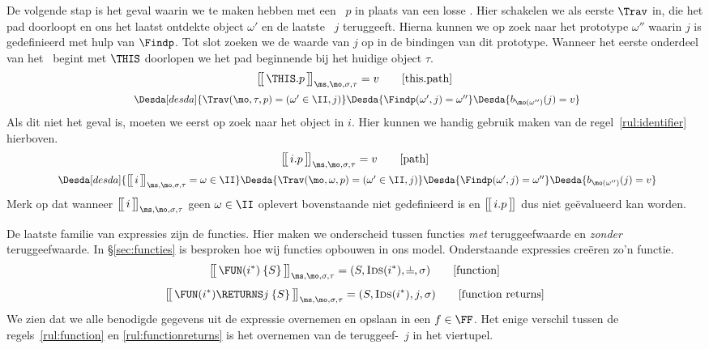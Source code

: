 De volgende stap is het geval waarin we te maken hebben met een \Path\ $p$ in plaats van een losse \Id. Hier schakelen we als eerste $\Trav$ in, die het pad doorloopt en ons het laatst ontdekte object $\omega'$ en de laatste \Id\ $j$ teruggeeft. Hierna kunnen we op zoek naar het prototype $\omega''$ waarin $j$ is gedefinieerd met hulp van $\Findp$. Tot slot zoeken we de waarde van $j$ op in de bindingen van dit prototype. Wanneer het eerste onderdeel van het \Path\ begint met $\THIS$ doorlopen we het pad beginnende bij het huidige object $\tau$.
%
\begin{gather*}
  \Express{\THIS.p}{\ms,\mo,\sigma,\tau} = v
  \tag*{[this.path]} \\
  \Desdas{
    \Desda[desda]{\Trav(\mo, \tau, p) = (\omega' \in \II, j)}
    \Desda{\Findp(\omega',j) = \omega''}
    \Desda{b_{\mo(\omega'')}(j) = v}
  }
\end{gather*}
%
Als dit niet het geval is, moeten we eerst op zoek naar het object in $i$. Hier kunnen we handig gebruik maken van de regel~\ref{rul:identifier} hierboven.
%
\begin{gather*}
  \Express{i.p}{\ms,\mo,\sigma,\tau} = v
  \tag*{[path]} \\
  \Desdas{
    \Desda[desda]{\Express{i}{\ms,\mo,\sigma,\tau} = \omega \in \II}
    \Desda{\Trav(\mo, \omega, p) = (\omega' \in \II, j)}
    \Desda{\Findp(\omega',j) = \omega''}
    \Desda{b_{\mo(\omega'')}(j) = v}
  }
\end{gather*}
%
Merk op dat wanneer $\Express{i}{\ms,\mo,\sigma,\tau}$ geen $\omega \in \II$ oplevert bovenstaande niet gedefinieerd is en $\big[\!\big[\,i.p\,\big]\!\big]^\text{}_{}$ dus niet geëvalueerd kan worden.

De laatste familie van expressies zijn de functies. Hier maken we onderscheid tussen functies \emph{met} teruggeefwaarde en \emph{zonder} teruggeefwaarde. In §\ref{sec:functies} is besproken hoe wij functies opbouwen in ons model. Onderstaande expressies creëren zo'n functie.
%
\begin{equation}
  \Express{\FUN (i^*) \: \{S\}}{\ms,\mo,\sigma,\tau} = (S, \textsc{Ids}(i^*), \nil, \sigma)
  \tag*{[function]}\label{rul:function}
\end{equation}
%
\begin{equation}
  \Express{\FUN (i^*) \RETURNS j \: \{S\}}{\ms,\mo,\sigma,\tau} = (S, \textsc{Ids}(i^*), j, \sigma)
  \tag*{[function returns]}\label{rul:functionreturns}
\end{equation}
%
We zien dat we alle benodigde gegevens uit de expressie overnemen en opslaan in een $f\in\FF$. Het enige verschil tussen de regels~\ref{rul:function} en \ref{rul:functionreturns} is het overnemen van de teruggeef-\Id\ $j$ in het viertupel.

